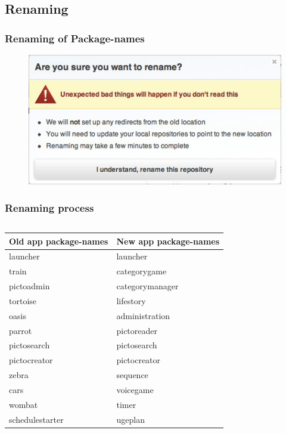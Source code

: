 \subsection{Renaming}
\begin{frame}
	\frametitle{Renaming of Package-names}
	\begin{figure}[H]
		\centering
		\includegraphics[width= 0.8 \textwidth]{pictures/Renaming.png}
	\end{figure}
\end{frame}

\begin{frame}
	\begin{center}
		\frametitle{Renaming process}
		\begin{columns} %
			\begin{column}{.9\textwidth}
				\begin{tabular}{ll}
					\textbf{Old app package-names} & \textbf{New app package-names}\\ \hline \noalign{\vskip 2mm}
					launcher & launcher\\ \hline
					train & categorygame\\ \hline
					pictoadmin & categorymanager\\ \hline
					tortoise & lifestory\\ \hline
					oasis & administration\\ \hline
					parrot & pictoreader\\ \hline
					pictosearch & pictosearch\\ \hline
					pictocreator & pictocreator\\ \hline
					zebra & sequence\\ \hline
					cars & voicegame\\ \hline
					wombat & timer\\ \hline
					schedulestarter & ugeplan\\ \hline
				\end{tabular}
			\end{column}%
		\end{columns}
	\end{center}
\end{frame}